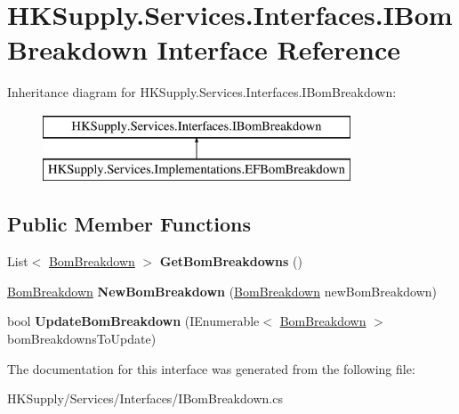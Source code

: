 \hypertarget{interface_h_k_supply_1_1_services_1_1_interfaces_1_1_i_bom_breakdown}{}\section{H\+K\+Supply.\+Services.\+Interfaces.\+I\+Bom\+Breakdown Interface Reference}
\label{interface_h_k_supply_1_1_services_1_1_interfaces_1_1_i_bom_breakdown}
Inheritance diagram for H\+K\+Supply.\+Services.\+Interfaces.\+I\+Bom\+Breakdown\+:\begin{figure}[H]
\begin{center}
\leavevmode
\includegraphics[height=2.000000cm]{interface_h_k_supply_1_1_services_1_1_interfaces_1_1_i_bom_breakdown}
\end{center}
\end{figure}
\subsection*{Public Member Functions}
\begin{DoxyCompactItemize}
\item 
\mbox{\label{interface_h_k_supply_1_1_services_1_1_interfaces_1_1_i_bom_breakdown_a53cbe4f527bf9593531267fba440ed6a}} 
List$<$ \mbox{\hyperlink{class_h_k_supply_1_1_models_1_1_bom_breakdown}{Bom\+Breakdown}} $>$ {\bfseries Get\+Bom\+Breakdowns} ()
\item 
\mbox{\label{interface_h_k_supply_1_1_services_1_1_interfaces_1_1_i_bom_breakdown_ae02c95b8373ffbaa8c94fea3ecbff05f}} 
\mbox{\hyperlink{class_h_k_supply_1_1_models_1_1_bom_breakdown}{Bom\+Breakdown}} {\bfseries New\+Bom\+Breakdown} (\mbox{\hyperlink{class_h_k_supply_1_1_models_1_1_bom_breakdown}{Bom\+Breakdown}} new\+Bom\+Breakdown)
\item 
\mbox{\label{interface_h_k_supply_1_1_services_1_1_interfaces_1_1_i_bom_breakdown_a5594becccb17288f1d6fdc094b8c6157}} 
bool {\bfseries Update\+Bom\+Breakdown} (I\+Enumerable$<$ \mbox{\hyperlink{class_h_k_supply_1_1_models_1_1_bom_breakdown}{Bom\+Breakdown}} $>$ bom\+Breakdowns\+To\+Update)
\end{DoxyCompactItemize}


The documentation for this interface was generated from the following file\+:\begin{DoxyCompactItemize}
\item 
H\+K\+Supply/\+Services/\+Interfaces/I\+Bom\+Breakdown.\+cs\end{DoxyCompactItemize}
